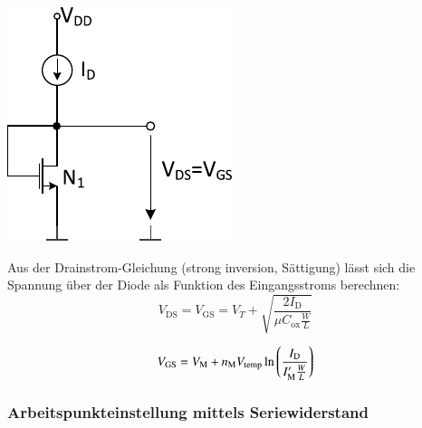 \begin{minipage}[t]{0.3\columnwidth}
    \includegraphics[width=\columnwidth, align=t]{images/04_MOS_diode_mit_stromquelle.pdf}
\end{minipage}
\hfill
\begin{minipage}[t]{0.66\columnwidth}
    Aus der Drainstrom-Gleichung (strong inversion, Sättigung) lässt sich die Spannung über der Diode als Funktion des Eingangsstroms berechnen:
    \[
        V_\text{DS} = V_\text{GS} = V_T + \sqrt{\frac{2 I_\text{D}}{\mu C_\text{ox} \frac{W}{L}}}
    \]

    \[
        V_{\rm GS} = V_\text{M} + n_{\rm M} V_\text{temp} \ln\left(\frac{I_\text{D}}{I_{\rm M}' \frac{W}{L}}\right)
    \]
\end{minipage}


\subsubsection{Arbeitspunkteinstellung mittels Seriewiderstand}

